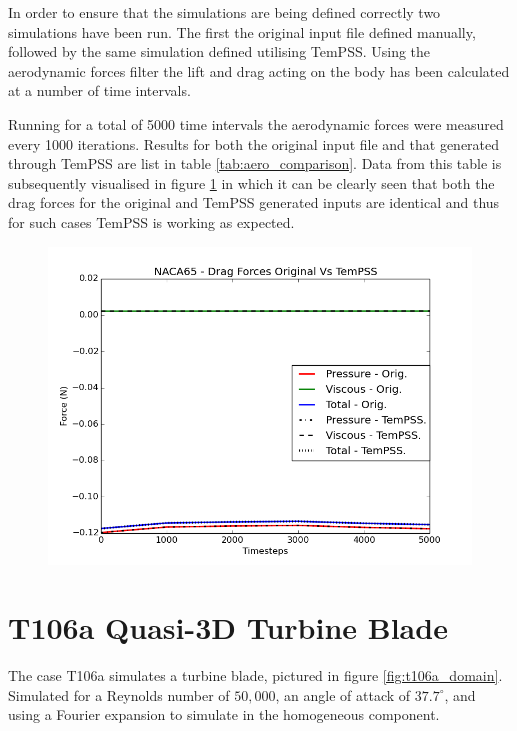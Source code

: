 \documentclass[11pt, a4paper]{report}
\begin{document}
In order to ensure that the simulations are being defined correctly two simulations have been run. The first the original input file defined manually, followed by the same simulation defined utilising TemPSS. Using the aerodynamic forces filter the lift and drag acting on the body has been calculated at a number of time intervals.

Running for a total of 5000 time intervals the aerodynamic forces were measured every 1000 iterations. Results for both the original input file and that generated through TemPSS are list in table \ref{tab:aero_comparison}. Data from this table is subsequently visualised in figure \ref{fig:drag_lift_comparison} in which it can be clearly seen that both the drag forces for the original and TemPSS generated inputs are identical and thus for such cases TemPSS is working as expected.

\begin{figure}[htb!]
 \centering
 \includegraphics[width=.95\linewidth,  clip=true, trim = 0cm 0cm 0cm 0cm]{drag}
 \label{fig:drag_lift_comparison}
\end{figure}

\newpage
\section{T106a Quasi-3D Turbine Blade}
The case T106a simulates a turbine blade, pictured in figure \ref{fig:t106a_domain}. Simulated for a Reynolds number of $50,000$, an angle of attack of $37.7^{\circ}$, and using a Fourier expansion to simulate in the homogeneous component.
\end{document}

